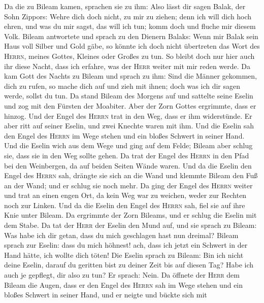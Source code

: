 Da die zu Bileam kamen, sprachen sie zu ihm: Also lässt dir sagen Balak,
der Sohn Zippors: Wehre dich doch nicht, zu mir zu ziehen;
 denn ich will dich hoch ehren, und was du mir sagst, das
will ich tun; komm doch und fluche mir diesem Volk. 
Bileam antwortete und sprach zu den Dienern Balaks: Wenn mir Balak sein
Haus voll Silber und Gold gäbe, so könnte ich doch nicht übertreten das
Wort des \textsc{Herrn}, meines Gottes, Kleines oder Großes zu tun.
 So bleibt doch nur hier auch ihr diese Nacht, dass ich
erfahre, was der \textsc{Herr} weiter mit mir reden werde.
 Da kam Gott des Nachts zu Bileam und sprach zu ihm: Sind
die Männer gekommen, dich zu rufen, so mache dich auf und zieh mit
ihnen; doch was ich dir sagen werde, sollst du tun.  Da
stand Bileam des Morgens auf und sattelte seine Eselin und zog mit den
Fürsten der Moabiter.  Aber der Zorn Gottes ergrimmte,
dass er hinzog. Und der Engel des \textsc{Herrn} trat in den Weg, dass
er ihm widerstünde. Er aber ritt auf seiner Eselin, und zwei Knechte
waren mit ihm.  Und die Eselin sah den Engel des
\textsc{Herrn} im Wege stehen und ein bloßes Schwert in seiner Hand. Und
die Eselin wich aus dem Wege und ging auf dem Felde; Bileam aber schlug
sie, dass sie in den Weg sollte gehen.  Da trat der Engel
des \textsc{Herrn} in den Pfad bei den Weinbergen, da auf beiden Seiten
Wände waren.  Und da die Eselin den Engel des
\textsc{Herrn} sah, drängte sie sich an die Wand und klemmte Bileam den
Fuß an der Wand; und er schlug sie noch mehr.  Da ging
der Engel des \textsc{Herrn} weiter und trat an einen engen Ort, da kein
Weg war zu weichen, weder zur Rechten noch zur Linken. 
Und da die Eselin den Engel des \textsc{Herrn} sah, fiel sie auf ihre
Knie unter Bileam. Da ergrimmte der Zorn Bileams, und er schlug die
Eselin mit dem Stabe.  Da tat der \textsc{Herr} der
Eselin den Mund auf, und sie sprach zu Bileam: Was habe ich dir getan,
dass du mich geschlagen hast nun dreimal?  Bileam sprach
zur Eselin: dass du mich höhnest! ach, dass ich jetzt ein Schwert in der
Hand hätte, ich wollte dich töten!  Die Eselin sprach zu
Bileam: Bin ich nicht deine Eselin, darauf du geritten bist zu deiner
Zeit bis auf diesen Tag? Habe ich auch je gepflegt, dir also zu tun? Er
sprach: Nein.  Da öffnete der \textsc{Herr} dem Bileam
die Augen, dass er den Engel des \textsc{Herrn} sah im Wege stehen und
ein bloßes Schwert in seiner Hand, und er neigte und bückte sich mit
